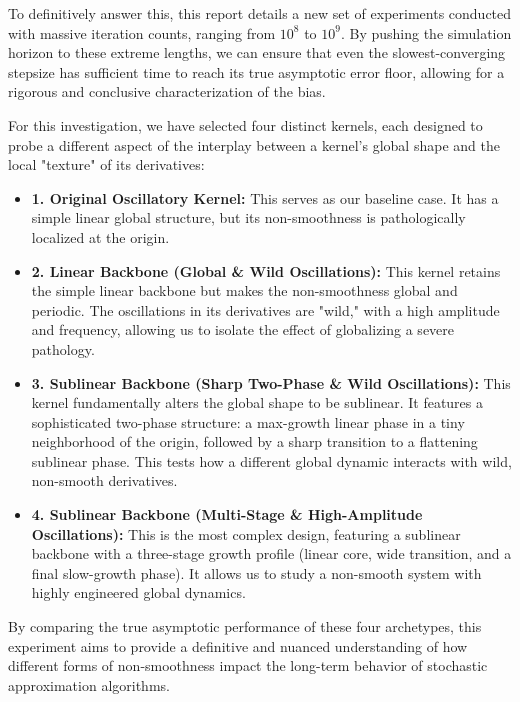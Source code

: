 \documentclass[a4paper]{article}
\begin{document}
To definitively answer this, this report details a new set of experiments conducted with massive iteration counts, ranging from $10^8$ to $10^9$. By pushing the simulation horizon to these extreme lengths, we can ensure that even the slowest-converging stepsize has sufficient time to reach its true asymptotic error floor, allowing for a rigorous and conclusive characterization of the bias.

For this investigation, we have selected four distinct kernels, each designed to probe a different aspect of the interplay between a kernel's global shape and the local "texture" of its derivatives:
\begin{itemize}
	\item \textbf{1. Original Oscillatory Kernel:} This serves as our baseline case. It has a simple linear global structure, but its non-smoothness is pathologically localized at the origin.
	
	\item \textbf{2. Linear Backbone (Global \& Wild Oscillations):} This kernel retains the simple linear backbone but makes the non-smoothness global and periodic. The oscillations in its derivatives are "wild," with a high amplitude and frequency, allowing us to isolate the effect of globalizing a severe pathology.
	
	\item \textbf{3. Sublinear Backbone (Sharp Two-Phase \& Wild Oscillations):} This kernel fundamentally alters the global shape to be sublinear. It features a sophisticated two-phase structure: a max-growth linear phase in a tiny neighborhood of the origin, followed by a sharp transition to a flattening sublinear phase. This tests how a different global dynamic interacts with wild, non-smooth derivatives.
	
	\item \textbf{4. Sublinear Backbone (Multi-Stage \& High-Amplitude Oscillations):} This is the most complex design, featuring a sublinear backbone with a three-stage growth profile (linear core, wide transition, and a final slow-growth phase). It allows us to study a non-smooth system with highly engineered global dynamics.
\end{itemize}

By comparing the true asymptotic performance of these four archetypes, this experiment aims to provide a definitive and nuanced understanding of how different forms of non-smoothness impact the long-term behavior of stochastic approximation algorithms.
\end{document}
